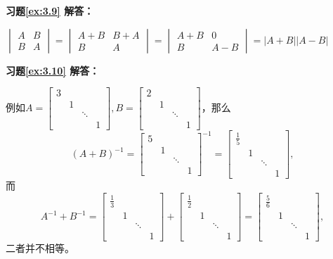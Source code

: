 \documentclass[a4paper]{book}
\begin{document}
\textbf{习题\ref{ex:3.9} 解答：}

$\begin{vmatrix} A & B \\ B & A \end{vmatrix} = \begin{vmatrix} A+B & B+A \\ B & A \end{vmatrix} = \begin{vmatrix} A+B & 0 \\ B & A-B \end{vmatrix} = |A + B||A - B|$

\vspace{1.5em}

\textbf{习题\ref{ex:3.10} 解答：}

例如$A = \begin{bmatrix} 3 & & & \\ & 1 & & \\ & & \ddots & \\ & & & 1 \end{bmatrix}, B = \begin{bmatrix} 2 & & & \\ & 1 & & \\ & & \ddots & \\ & & & 1 \end{bmatrix}$，那么
$$(A+B)^{-1} = \begin{bmatrix} 5 & & & \\ & 1 & & \\ & & \ddots & \\ & & & 1 \end{bmatrix}^{-1} = \begin{bmatrix} \frac15 & & & \\ & 1 & & \\ & & \ddots & \\ & & & 1 \end{bmatrix},$$
而
$$A^{-1}+B^{-1} = \begin{bmatrix} \frac13 & & & \\ & 1 & & \\ & & \ddots & \\ & & & 1 \end{bmatrix} + \begin{bmatrix} \frac12 & & & \\ & 1 & & \\ & & \ddots & \\ & & & 1 \end{bmatrix} = \begin{bmatrix} \frac56 & & & \\ & 1 & & \\ & & \ddots & \\ & & & 1 \end{bmatrix},$$
二者并不相等。
\end{document}
